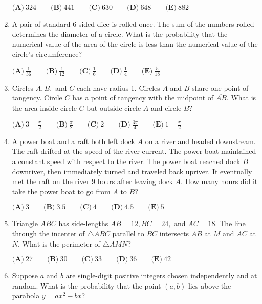 \documentclass{article}
\begin{document}
\begin{enumerate}[label=\arabic*., itemsep=0.5em]
$
\textbf{(A)}\ 324 \qquad
\textbf{(B)}\ 441 \qquad
\textbf{(C)}\ 630 \qquad
\textbf{(D)}\ 648 \qquad
\textbf{(E)}\ 882 $\par \vspace{0.5em}\item A pair of standard $6$-sided dice is rolled once. The sum of the numbers rolled determines the diameter of a circle. What is the probability that the numerical value of the area of the circle is less than the numerical value of the circle's circumference?

$
\textbf{(A)}\ \frac{1}{36} \qquad
\textbf{(B)}\ \frac{1}{12} \qquad
\textbf{(C)}\ \frac{1}{6} \qquad
\textbf{(D)}\ \frac{1}{4} \qquad
\textbf{(E)}\ \frac{5}{18} $\par \vspace{0.5em}\item Circles $A, B,$ and $C$ each have radius 1. Circles $A$ and $B$ share one point of tangency. Circle $C$ has a point of tangency with the midpoint of $\overline{AB}.$ What is the area inside circle $C$ but outside circle $A$ and circle $B?$

$
\textbf{(A)}\ 3 - \frac{\pi}{2} \qquad
\textbf{(B)}\ \frac{\pi}{2} \qquad
\textbf{(C)}\  2 \qquad
\textbf{(D)}\ \frac{3\pi}{4} \qquad
\textbf{(E)}\ 1+\frac{\pi}{2} $\par \vspace{0.5em}\item A power boat and a raft both left dock $A$ on a river and headed downstream. The raft drifted at the speed of the river current. The power boat maintained a constant speed with respect to the river. The power boat reached dock $B$ downriver, then immediately turned and traveled back upriver. It eventually met the raft on the river 9 hours after leaving dock $A.$ How many hours did it take the power boat to go from $A$ to $B?$

$
\textbf{(A)}\ 3 \qquad
\textbf{(B)}\ 3.5 \qquad
\textbf{(C)}\  4 \qquad
\textbf{(D)}\ 4.5 \qquad
\textbf{(E)}\ 5 $\par \vspace{0.5em}\item Triangle $ABC$ has side-lengths $AB = 12, BC = 24,$ and $AC = 18.$ The line through the incenter of $\triangle ABC$ parallel to $\overline{BC}$ intersects $\overline{AB}$ at $M$ and $\overline{AC}$ at $N.$ What is the perimeter of $\triangle AMN?$

$
\textbf{(A)}\ 27 \qquad
\textbf{(B)}\ 30 \qquad
\textbf{(C)}\  33 \qquad
\textbf{(D)}\ 36 \qquad
\textbf{(E)}\ 42 $\par \vspace{0.5em}\item Suppose $a$ and $b$ are single-digit positive integers chosen independently and at random. What is the probability that the point $(a,b)$ lies above the parabola $y=ax^2-bx$?


\end{enumerate}
\end{document}
